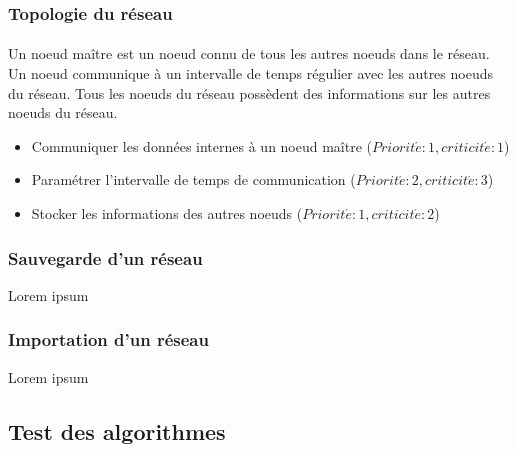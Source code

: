\documentclass[12pt]{article}
\newcommand{\besoin}[2] {
  ($Priorit\acute{e} : #1, criticit\acute{e} : #2$)
}
\begin{document}


\subsubsection{Topologie du réseau}

\paragraph{} Un noeud maître est un noeud connu de tous les autres noeuds dans le réseau. Un noeud communique à un intervalle de temps régulier avec les autres noeuds du réseau. Tous les noeuds du réseau possèdent des informations sur les autres noeuds du réseau.

\begin{itemize}
	\item Communiquer les données internes à un noeud maître \besoin{1}{1}
	\item Paramétrer l'intervalle de temps de communication \besoin{2}{3}
	\item Stocker les informations des autres noeuds \besoin{1}{2}
\end{itemize}

\subsubsection{Sauvegarde d'un réseau}
Lorem ipsum

\subsubsection{Importation d'un réseau}
Lorem ipsum



\subsection{Test des algorithmes}
\end{document}
